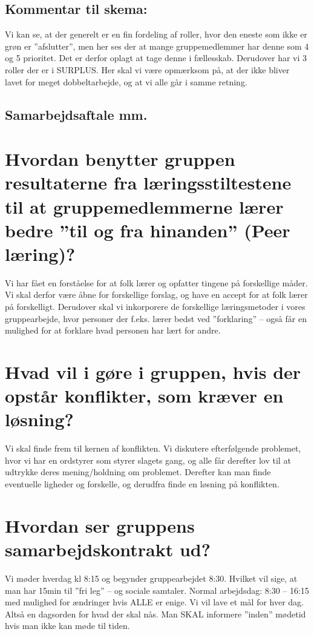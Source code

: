 \documentclass[oneside,a4paper,titlepage]{article}
\begin{document}
\subsection*{Kommentar til skema:}
Vi kan se, at der generelt er en fin fordeling af roller, hvor den eneste som ikke er grøn er ”afslutter”, men her ses der at mange gruppemedlemmer har denne som 4 og 5 prioritet. Det er derfor oplagt at tage denne i fællesskab. Derudover har vi 3 roller der er i SURPLUS. Her skal vi være opmærksom på, at der ikke bliver lavet for meget dobbeltarbejde, og at vi alle går i samme retning.

\subsection{Samarbejdsaftale mm.}
\label{sec:samarbejdsaftale}

\section*{Hvordan benytter gruppen resultaterne fra læringsstiltestene til at gruppemedlemmerne lærer bedre ”til og fra hinanden” (Peer læring)?}
Vi har fået en forståelse for at folk lærer og opfatter tingene på forskellige måder. Vi skal derfor være åbne for forskellige forslag, og have en accept for at folk lærer på forskelligt. Derudover skal vi inkorporere de forskellige læringsmetoder i vores gruppearbejde, hvor personer der f.eks. lærer bedst ved ”forklaring” – også får en mulighed for at forklare hvad personen har lært for andre.
\section*{Hvad vil i gøre i gruppen, hvis der opstår konflikter, som kræver en løsning?}
Vi skal finde frem til kernen af konflikten. Vi diskutere efterfølgende problemet, hvor vi har en ordstyrer som styrer slagets gang, og alle får derefter lov til at udtrykke deres mening/holdning om problemet. Derefter kan man finde eventuelle ligheder og forskelle, og derudfra finde en løsning på konflikten.
\section*{Hvordan ser gruppens samarbejdskontrakt ud?}
Vi møder hverdag kl 8:15 og begynder gruppearbejdet 8:30. Hvilket vil sige, at man har 15min til ”fri leg” – og sociale samtaler.
Normal arbejdsdag: 8:30 – 16:15 med mulighed for ændringer hvis ALLE er enige.
Vi vil lave et mål for hver dag. Altså en dagsorden for hvad der skal nås.
Man SKAL informere ”inden” mødetid hvis man ikke kan møde til tiden.
\end{document}
